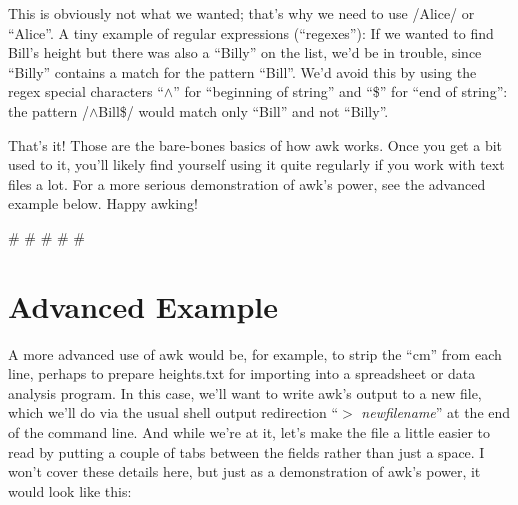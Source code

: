 \documentclass[10pt]{article}
\begin{document}
\ttfamily
\colorbox{black}{}
\normalfont

This is obviously not what we wanted; that's why we need to use /Alice/ or ``Alice''. A tiny example of regular expressions (``regexes''): If we wanted to find Bill's height but there was also a ``Billy'' on the list, we'd be in trouble, since ``Billy'' contains a match for the pattern ``Bill''. We'd avoid this by using the regex special characters ``$\wedge$'' for ``beginning of string'' and ``\$'' for ``end of string'': the pattern /$\wedge$Bill\$/ would match only ``Bill'' and not ``Billy''.


That's it! Those are the bare-bones basics of how awk works. Once you get a bit used to it, you'll likely find yourself using it quite regularly if you work with text files a lot. For a more serious demonstration of awk's power, see the advanced example below. Happy awking!



\# \# \# \# \#

\pagebreak

\section*{Advanced Example}

A more advanced use of awk would be, for example, to strip the ``cm'' from each line, perhaps to prepare heights.txt for importing into a spreadsheet or data analysis program.  In this case, we'll want to write awk's output to a new file, which we'll do via the usual shell output redirection ``$>$ \emph{newfilename}'' at the end of the command line. And while we're at it, let's make the file a little easier to read by putting a couple of tabs between the fields rather than just a space. I won't cover these details here, but just as a demonstration of awk's power, it would look like this:

\ttfamily
\colorbox{black}{\color{white}{
\small
user@host:$\sim$\$  awk '\{\textcolor{cyan}{match}(\textcolor{red}{\$2}, \textcolor{lavender}{/[}\textcolor{yellow}{[:digit:]}\textcolor{lavender}{]}\textcolor{red}{$\ast$}\textcolor{lavender}{/}, a); \textcolor{yellow}{print} \textcolor{red}{\$1}``\textcolor{red}{\textbackslash t\textbackslash t}''a[0]\}' heights.txt $>$ heights\_without\_units.txt
}}
\normalfont
\end{document}
